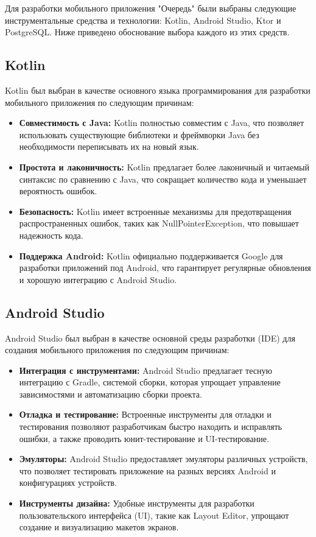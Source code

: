 Для разработки мобильного приложения "Очередь"
были выбраны следующие инструментальные средства и технологии:
Kotlin, Android Studio, Ktor и PostgreSQL.
Ниже приведено обоснование выбора каждого из этих средств.

\subsection{Kotlin}

Kotlin был выбран в качестве основного языка программирования
для разработки мобильного приложения по следующим причинам:

\begin{itemize}
    \item \textbf{Совместимость с Java:} Kotlin полностью совместим с Java,
		что позволяет использовать существующие библиотеки
		и фреймворки Java без необходимости переписывать их на новый язык.
    \item \textbf{Простота и лаконичность:} Kotlin предлагает более лаконичный
		и читаемый синтаксис по сравнению с Java,
		что сокращает количество кода и уменьшает вероятность ошибок.
    \item \textbf{Безопасность:} Kotlin имеет встроенные механизмы
		для предотвращения распространенных ошибок,
		таких как NullPointerException, что повышает надежность кода.
    \item \textbf{Поддержка Android:} Kotlin официально поддерживается Google
		для разработки приложений под Android,
		что гарантирует регулярные обновления
		и хорошую интеграцию с Android Studio.
\end{itemize}

\subsection{Android Studio}

Android Studio был выбран в качестве основной среды разработки (IDE)
для создания мобильного приложения по следующим причинам:

\begin{itemize}
    \item \textbf{Интеграция с инструментами:} Android Studio предлагает
		тесную интеграцию с Gradle, системой сборки,
		которая упрощает управление зависимостями
		и автоматизацию сборки проекта.
    \item \textbf{Отладка и тестирование:} Встроенные инструменты для отладки
		и тестирования позволяют разработчикам быстро находить
		и исправлять ошибки, а также проводить юнит-тестирование
		и UI-тестирование.
    \item \textbf{Эмуляторы:} Android Studio предоставляет эмуляторы различных
		устройств, что позволяет тестировать приложение на разных версиях
		Android и конфигурациях устройств.
    \item \textbf{Инструменты дизайна:} Удобные инструменты
		для разработки пользовательского интерфейса (UI),
		такие как Layout Editor, упрощают создание
		и визуализацию макетов экранов.
\end{itemize}

